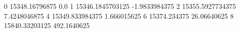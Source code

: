 0 15348.16796875 0.0
1 15346.1845703125 -1.9833984375
2 15355.5927734375 7.4248046875
4 15349.833984375 1.666015625
6 15374.234375 26.06640625
8 15840.33203125 492.1640625
